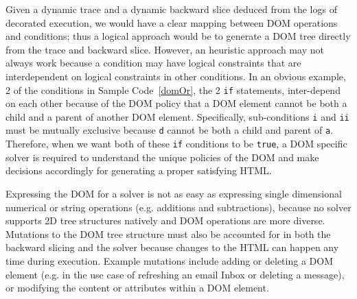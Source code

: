 Given a dynamic trace and a dynamic backward slice deduced from the logs of decorated execution, we would have a clear mapping between DOM operations and conditions; thus a logical approach would be to generate a DOM tree directly from the trace and backward slice.  
However, an heuristic approach may not always work because a condition may have logical constraints that are interdependent on logical constraints in other conditions.  
In an obvious example, 2 of the conditions in Sample Code~\ref{domOr}, the 2 {\tt if} statements, inter-depend on each other because of the DOM policy that a DOM element cannot be both a child and a parent of another DOM element.  
Specifically, sub-conditions {\tt i} and {\tt ii} must be mutually exclusive because {\tt d} cannot be both a child and parent of {\tt a}.
Therefore, when we want both of these {\tt if} conditions to be {\tt true}, a DOM specific solver is required to understand the unique policies of the DOM and make decisions accordingly for generating a proper satisfying HTML.



Expressing the DOM for a solver is not as easy as expressing single dimensional numerical or string operations (e.g. additions and subtractions), because no solver supports 2D tree structures natively and DOM operations are more diverse.  
Mutations to the DOM tree structure must also be accounted for in both the backward slicing and the solver because changes to the HTML can happen any time during execution.  
Example mutations include adding or deleting a DOM element (e.g. in the use case of refreshing an email Inbox or deleting a message), or modifying the content or attributes within a DOM element.  
